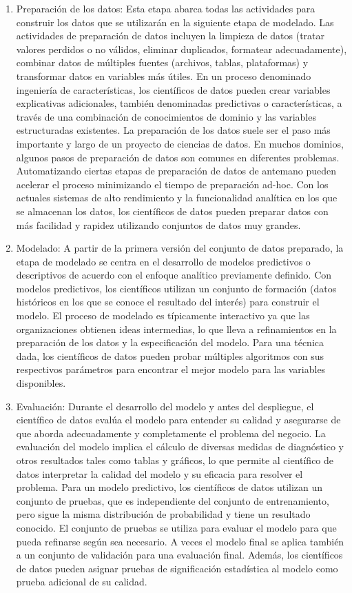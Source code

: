 \begin{enumerate}
\item Preparación de los datos: Esta etapa abarca todas las actividades para construir los datos que se utilizarán en la siguiente etapa de modelado. Las actividades de preparación de datos incluyen la limpieza de datos (tratar valores perdidos o no válidos, eliminar duplicados, formatear adecuadamente), combinar datos de múltiples fuentes (archivos, tablas, plataformas) y transformar datos en variables más útiles.
En un proceso denominado ingeniería de características, los científicos de datos pueden crear variables explicativas adicionales, también denominadas predictivas o características, a través de una combinación de conocimientos de dominio y las variables estructuradas existentes. La preparación de los datos suele ser el paso más importante y largo de un proyecto de ciencias de datos. En muchos dominios, algunos pasos de preparación de datos son comunes en diferentes problemas. Automatizando ciertas etapas de preparación de datos de antemano pueden acelerar el proceso minimizando el tiempo de preparación ad-hoc. Con los actuales sistemas de alto rendimiento y la funcionalidad analítica en los que se almacenan los datos, los científicos de datos pueden preparar datos con más facilidad y rapidez utilizando conjuntos de datos muy grandes.
\item Modelado: A partir de la primera versión del conjunto de datos preparado, la etapa de modelado se centra en el desarrollo de modelos predictivos o descriptivos de acuerdo con el enfoque analítico previamente definido. Con modelos predictivos, los científicos utilizan un conjunto de formación (datos históricos en los que se conoce el resultado del interés) para construir el modelo. El proceso de modelado es típicamente interactivo ya que las organizaciones obtienen ideas intermedias, lo que lleva a refinamientos en la preparación de los datos y la especificación del modelo. Para una técnica dada, los científicos de datos pueden probar múltiples algoritmos con sus respectivos parámetros para encontrar el mejor modelo para las variables disponibles.
\item Evaluación: Durante el desarrollo del modelo y antes del despliegue, el científico de datos evalúa el modelo para entender su calidad y asegurarse de que aborda adecuadamente y completamente el problema del negocio. La evaluación del modelo implica el cálculo de diversas medidas de diagnóstico y otros resultados tales como tablas y gráficos, lo que permite al científico de datos interpretar la calidad del modelo y su eficacia para resolver el problema. Para un modelo predictivo, los científicos de datos utilizan un conjunto de pruebas, que es independiente del conjunto de entrenamiento, pero sigue la misma distribución de probabilidad y tiene un resultado conocido. El conjunto de pruebas se utiliza para evaluar el modelo para que pueda refinarse según sea necesario. A veces el modelo final se aplica también a un conjunto de validación para una evaluación final. Además, los científicos de datos pueden asignar pruebas de significación estadística al modelo como prueba adicional de su calidad. 

\end{enumerate}
